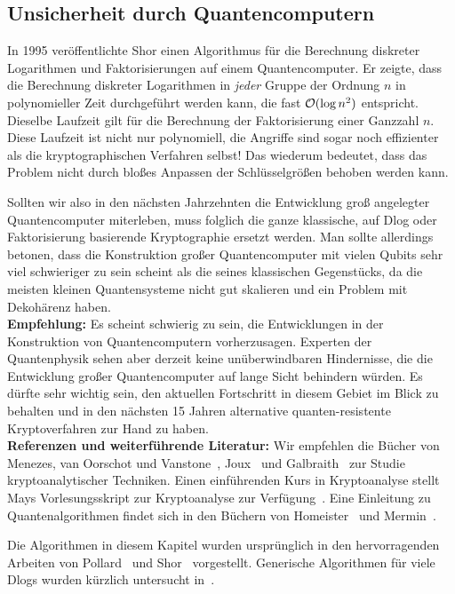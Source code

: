 \begin{refsegment}
\subsection{Unsicherheit durch Quantencomputern}
In 1995 veröffentlichte Shor einen Algorithmus für die Berechnung diskreter Logarithmen und Faktorisierungen auf einem Quantencomputer. Er zeigte, dass die Berechnung diskreter Logarithmen in {\em jeder} Gruppe der Ordnung $n$ in polynomieller Zeit durchgeführt werden kann, die fast ${\cal O}(\log n^2)$ entspricht. Dieselbe Laufzeit gilt für die Berechnung der Faktorisierung einer Ganzzahl $n$. Diese Laufzeit ist nicht nur polynomiell, die Angriffe sind sogar noch effizienter als die kryptographischen Verfahren selbst! Das wiederum bedeutet, dass das Problem nicht durch bloßes Anpassen der Schlüsselgrößen behoben werden kann.

Sollten wir also in den nächsten Jahrzehnten die Entwicklung groß angelegter Quantencomputer miterleben, muss folglich die ganze klassische, auf Dlog oder Faktorisierung basierende Kryptographie ersetzt werden. Man sollte allerdings betonen, dass die Konstruktion großer Quantencomputer mit vielen Qubits sehr viel schwieriger zu sein scheint als die seines klassischen Gegenstücks, da die meisten kleinen Quantensysteme nicht gut skalieren und ein Problem mit Dekohärenz haben.\\[0.1cm]

\textbf{Empfehlung:} Es scheint schwierig zu sein, die Entwicklungen in der Konstruktion von Quantencomputern vorherzusagen. Experten der Quantenphysik sehen aber derzeit keine unüberwindbaren Hindernisse, die die Entwicklung großer Quantencomputer auf lange Sicht behindern würden. Es dürfte sehr wichtig sein, den aktuellen Fortschritt in diesem Gebiet im Blick zu behalten und in den nächsten 15 Jahren alternative quanten-resistente Kryptoverfahren zur Hand zu haben.\\[0.1cm]

\textbf{Referenzen und weiterführende Literatur:}
Wir empfehlen die Bücher von Menezes, van Oorschot und Vanstone~\cite{Menezes2001}, Joux~\cite{Joux2009} und Galbraith~\cite{Galbraith2012} zur Studie kryptoanalytischer Techniken. Einen einführenden Kurs in Kryptoanalyse stellt Mays Vorlesungsskript zur Kryptoanalyse zur Verfügung~\cite{May2012a,May2012b}. Eine Einleitung zu Quantenalgorithmen findet sich in den Büchern von Homeister~\cite{Homeister2007} und Mermin~\cite{Mermin2008}.

Die Algorithmen in diesem Kapitel wurden ursprünglich in den hervorragenden Arbeiten von Pollard~\cite{Pollard1975,Pollard2000} und Shor~\cite{Shor1994} vorgestellt.
Generische Algorithmen für viele Dlogs wurden kürzlich untersucht in~\cite{multiple2014}.



\end{refsegment}
